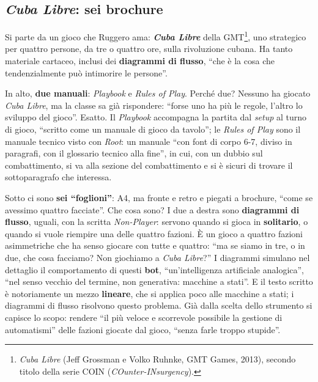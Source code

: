 \subsection{\emph{Cuba Libre}: sei brochure}



Si parte da un gioco che Ruggero ama: \textbf{\emph{Cuba Libre}} della GMT\footnote{
\emph{Cuba Libre} (Jeff Grossman e Volko Ruhnke, GMT Games, 2013), secondo titolo della
serie COIN (\emph{COunter-INsurgency}).}, uno strategico per quattro persone, da tre o
quattro ore, sulla rivoluzione cubana. Ha tanto materiale cartaceo, inclusi dei
\textbf{diagrammi di flusso}, ``che è la cosa che tendenzialmente può intimorire le
persone''.

In alto, \textbf{due manuali}: \emph{Playbook} e \emph{Rules of Play}. Perché due?
Nessuno ha giocato \emph{Cuba Libre}, ma la classe sa già rispondere: ``forse uno ha più
le regole, l'altro lo sviluppo del gioco''. Esatto. Il \emph{Playbook} accompagna la
partita dal \emph{setup} al turno di gioco, ``scritto come un manuale di gioco da
tavolo''; le \emph{Rules of Play} sono il manuale tecnico visto con \emph{Root}: un
manuale ``con font di corpo 6-7, diviso in paragrafi, con il glossario tecnico alla
fine'', in cui, con un dubbio sul combattimento, si va alla sezione del combattimento e
si è sicuri di trovare il sottoparagrafo che interessa.

Sotto ci sono \textbf{sei ``foglioni''}: A4, ma fronte e retro e piegati a brochure,
``come se avessimo quattro facciate''. Che cosa sono? I due a destra sono
\textbf{diagrammi di flusso}, uguali, con la scritta \emph{Non-Player}: servono quando si
gioca in \textbf{solitario}, o quando si vuole riempire una delle quattro fazioni. È un
gioco a quattro fazioni asimmetriche che ha senso giocare con tutte e quattro: ``ma se
siamo in tre, o in due, che cosa facciamo? Non giochiamo a \emph{Cuba Libre}?'' I
diagrammi simulano nel dettaglio il comportamento di questi \textbf{bot}, ``un'intelligenza
artificiale analogica'', ``nel senso vecchio del termine, non generativa: macchine a
stati''. E il testo scritto è notoriamente un mezzo \textbf{lineare}, che si applica poco
alle macchine a stati; i diagrammi di flusso risolvono questo problema. Già dalla scelta
dello strumento si capisce lo scopo: rendere ``il più veloce e scorrevole possibile la
gestione di automatismi'' delle fazioni giocate dal gioco, ``senza farle troppo
stupide''.

